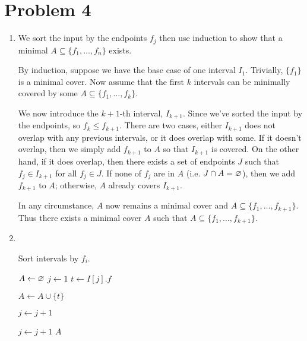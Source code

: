 \documentclass[12pt,a4paper]{article}
\begin{document}
\newpage
\section*{Problem 4}

\begin{enumerate}
	\item
	We sort the input by the endpoints $f_j$ then use induction to show that a minimal $A \subseteq \{f_1, \dots, f_n\}$ exists.

	By induction, suppose we have the base case of one interval $I_1$. Trivially, $\{f_1\}$ is a minimal cover. Now assume that the first $k$ intervals can be minimally covered by some $A \subseteq \{f_1, \dots, f_k\}$.
	
	We now introduce the $k+1$-th interval, $I_{k+1}$. Since we've sorted the input by the endpoints, so $f_k \le f_{k+1}$. There are two cases, either $I_{k+1}$ does not overlap with any previous intervals, or it does overlap with some. If it doesn't overlap, then we simply add $f_{k+1}$ to $A$ so that $I_{k+1}$ is covered. On the other hand, if it does overlap, then there exists a set of endpoints $J$ such that $f_j \in I_{k+1}$ for all $f_j \in J$. If none of $f_j$ are in $A$ (i.e. $J \cap A = \varnothing$), then we add $f_{k+1}$ to $A$; otherwise, $A$ already covers $I_{k+1}$.
	
	In any circumstance, $A$ now remains a minimal cover and $A \subseteq \{f_1, \dots, f_{k+1}\}$. Thus there exists a minimal cover $A$ such that $A \subseteq \{f_1, \dots, f_{k+1}\}$.

	\item \-\\
	\begin{algorithm}
		\begin{algorithmic}[1]
				\State Sort intervals by $f_i$.

				\State $A \gets \varnothing$
				\State $j \gets 1$
					\State $t \gets I[j].f$

					\State $A \gets A \cup \{t\}$

					\State $j \gets j + 1$

						\State $j \gets j + 1$
					\EndWhile
				\EndWhile
				\Return $A$
			\EndFunction
		\end{algorithmic}
	\end{algorithm}


\end{enumerate}
\end{document}
